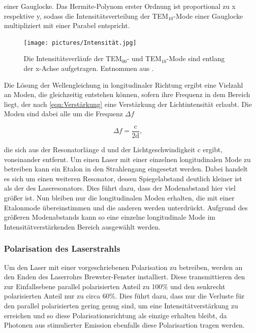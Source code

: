             einer Gauglocke. Das Hermite-Polynom erster Ordnung ist proportional zu x respektive y, sodass die Intensitätsverteilung der TEM$_{10}$-Mode einer Gauglocke multipliziert mit einer Parabel 
            entspricht.\newline

            \begin{figure}[h]
                \centering
                \texttt{[image: pictures/Intensität.jpg]}
                \caption{Die Intensitätsverläufe der TEM$_{00}$- und TEM$_{10}$-Mode sind entlang der x-Achse aufgetragen. Entnommen aus \cite{demtroder_laserspektroskopie_2011}.}
                \label{fig:Intensität}
            \end{figure}

         

            Die Lösung der Wellengleichung in longitudinaler Richtung ergibt eine Vielzahl an Moden, die gleichzeitig entstehen können, sofern ihre Frequenz in dem Bereich liegt, der nach \ref{eqn:Verstärkung}
            eine Verstärkung der Lichtintensität erlaubt. Die Moden sind dabei alle um die Frequenz $\Delta f$ 

            \begin{equation*}
                \Delta f = \frac{\text{c}}{2\text{d}},
            \end{equation*}

            die sich aus der Resonatorlänge d und der Lichtgeschwindigkeit c ergibt, voneinander entfernt. Um einen Laser mit einer einzelnen longitudinalen Mode zu betreiben kann ein Etalon in den 
            Strahlengang eingesetzt werden. Dabei handelt es sich um einen weiteren Resonator, dessen Spiegelabstand deutlich kleiner ist als der des Laseresonators. Dies führt dazu, dass der Modenabstand 
            hier viel größer ist. Nun bleiben nur die longitudinalen Moden erhalten, die mit einer Etalonmode übereinstimmen und die anderen werden unterdrückt. Aufgrund des größeren Modenabstands kann so eine
            einzelne longitudinale Mode im Intensitätverstärkenden Bereich ausgewählt werden. 

        \subsubsection{Polarisation des Laserstrahls}
            Um den Laser mit einer vorgeschriebenen Polarisation zu betreiben, werden an den Enden des Laserrohrs Brewster-Fenster installiert. Diese transmittieren den zur Einfallsebene parallel polarisierten
            Anteil zu 100\% und den senkrecht polarisierten Anteil nur zu circa 60\%. Dies führt dazu, dass nur die Verluste für den parallel polarisierten gering genug sind, um eine Intensitätverstärkung zu 
            erreichen und so diese Polarisationsrichtung als einzige erhalten bleibt, da Photonen aus stimulierter Emission ebenfalls diese Polarisartion tragen werden.  


